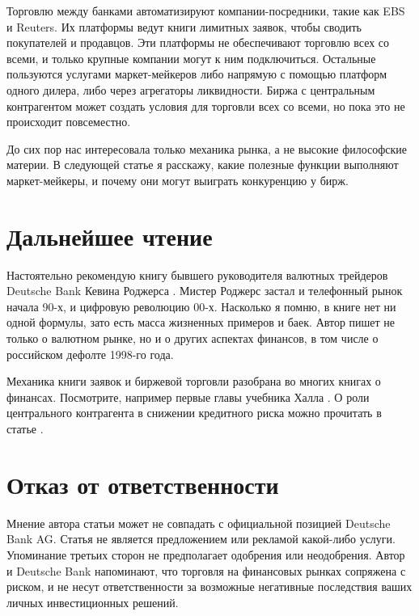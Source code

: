 Торговлю между банками автоматизируют компании-посредники, такие как EBS и
Reuters. Их платформы ведут книги лимитных заявок, чтобы сводить покупателей и
продавцов. Эти платформы не обеспечивают торговлю всех со всеми, и только
крупные компании могут к ним подключиться. Остальные пользуются услугами
маркет-мейкеров либо напрямую с помощью платформ одного дилера, либо через
агрегаторы ликвидности. Биржа с центральным контрагентом может создать условия
для торговли всех со всеми, но пока это не происходит повсеместно.

До сих пор нас интересовала только механика рынка, а не высокие философские
материи. В следующей статье я расскажу, какие полезные функции выполняют
маркет-мейкеры, и почему они могут выиграть конкуренцию у бирж.

\section*{Дальнейшее чтение}

Настоятельно рекомендую книгу бывшего руководителя валютных трейдеров Deutsche
Bank Кевина Роджерса \cite{rodgers2016why}. Мистер Роджерс застал и телефонный
рынок начала 90-х, и цифровую революцию 00-х. Насколько я помню, в книге нет ни
одной формулы, зато есть масса жизненных примеров и баек.
Автор пишет не только о валютном рынке, но и о других аспектах финансов, в том
числе о российском дефолте 1998-го года.

Механика книги заявок и биржевой торговли разобрана во многих книгах о финансах.
Посмотрите, например первые главы учебника Халла
\cite[ch.~1--2]{hull2015options}. О роли центрального контрагента в снижении
кредитного риска можно прочитать в статье \cite{domanski2015central}.

\section*{Отказ от ответственности}

Мнение автора статьи может не совпадать с официальной позицией Deutsche Bank AG.
Статья не является предложением или рекламой какой-либо услуги. Упоминание
третьих сторон не предполагает одобрения или неодобрения. Автор и Deutsche Bank
напоминают, что торговля на финансовых рынках сопряжена с риском, и не несут
ответственности за возможные негативные последствия ваших личных инвестиционных
решений.

\begin{otherlanguage}{english}
\printbibliography[title = \begin{otherlanguage}{russian}Список
литературы\end{otherlanguage}]
\end{otherlanguage}
\printendnotes

